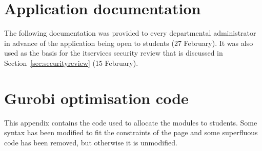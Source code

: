 \documentclass[draft]{scrartcl}
\let\stdsection\section
\renewcommand\section{\clearpage\stdsection}
\begin{document}
\clearpage

\stdsection{Application documentation}
\label{sec:documentation}

The following documentation was provided to every departmental administrator
in advance of the application being open to students (27 February). It was
also used as the basis for the \gls{itservices} security review that is
discussed in Section~\ref{sec:securityreview} (15 February).



\stdsection{Gurobi optimisation code}
\label{sec:gurobicode}

This appendix contains the code used to allocate the modules to students. Some
syntax has been modified to fit the constraints of the page and some
superfluous code has been removed, but otherwise it is unmodified.

\begin{landscape}
  
\end{landscape}

\clearpage
\printglossaries

\clearpage

\end{document}
